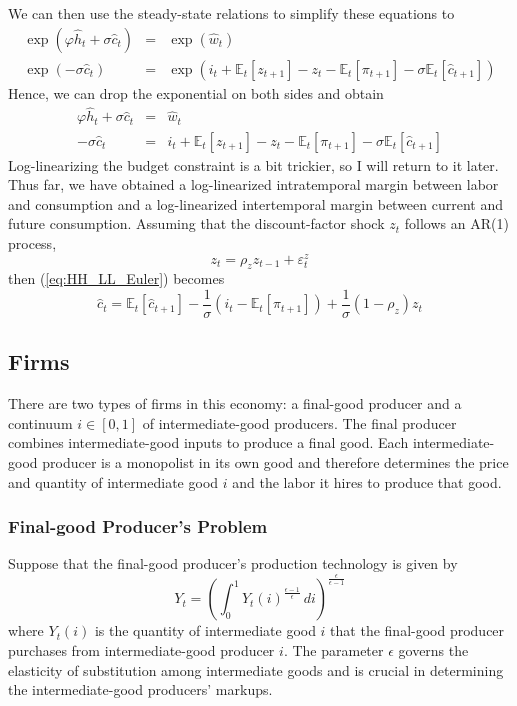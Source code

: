 \documentclass[12pt]{article}
\newcommand{\E}{\mathbb{E}}
\begin{document}
We can then use the steady-state relations to simplify these equations to
\begin{eqnarray}
	\exp(\varphi \hat{h}_t + \sigma \hat{c}_t) & = & \exp(\hat{w}_t) \\
	\exp(-\sigma \hat{c}_t) &=& \exp(i_t + \E_t [z_{t+1}] - z_t - \E_t [\pi_{t+1}] - \sigma \E_t [\hat{c}_{t+1}])
\end{eqnarray}
Hence, we can drop the exponential on both sides and obtain
\begin{eqnarray}
	\varphi \hat{h}_t + \sigma \hat{c}_t & = & \hat{w}_t  \label{eq:HH_LL_intra}\\
	-\sigma \hat{c}_t &=&  i_t + \E_t [z_{t+1}] - z_t - \E_t [\pi_{t+1}] - \sigma \E_t [\hat{c}_{t+1}] \label{eq:HH_LL_Euler}
\end{eqnarray}
Log-linearizing the budget constraint is a bit trickier, so I will return to it later. Thus far, we have obtained a log-linearized intratemporal margin between labor and consumption and a log-linearized intertemporal margin between current and future consumption. Assuming that the discount-factor shock $z_t$ follows an AR(1) process,
\begin{equation}
	z_t = \rho_z z_{t-1} + \varepsilon_t^z
\end{equation}
then (\ref{eq:HH_LL_Euler}) becomes
\begin{equation}
	\hat{c}_t = \E_t [\hat{c}_{t+1}] - \frac{1}{\sigma} (i_t - \E_t[\pi_{t+1}]) + \frac{1}{\sigma} (1-\rho_z) z_t
\end{equation}

\subsection{Firms}

There are two types of firms in this economy: a final-good producer and a continuum $i \in [0,1]$ of intermediate-good producers. The final producer combines intermediate-good inputs to produce a final good. Each intermediate-good producer is a monopolist in its own good and therefore determines the price and quantity of intermediate good $i$ and the labor it hires to produce that good.

\subsubsection{Final-good Producer's Problem}

Suppose that the final-good producer's production technology is given by
\begin{equation} \label{eq:ces}
	Y_t = \left(\int_0^1 Y_t(i)^{\frac{\epsilon-1}{\epsilon}}\, di\right)^{\frac{\epsilon}{\epsilon-1}}
\end{equation}
where $Y_t(i)$ is the quantity of intermediate good $i$ that the final-good producer purchases from intermediate-good producer $i$. The parameter $\epsilon$ governs the elasticity of substitution among intermediate goods and is crucial in determining the intermediate-good producers' markups.
\end{document}
